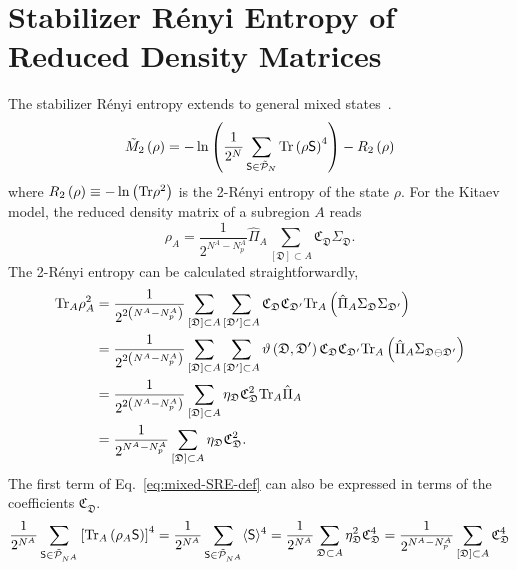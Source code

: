 \section{Stabilizer R\'enyi Entropy of Reduced Density Matrices}
The stabilizer R\'enyi entropy extends to general mixed states~\cite{Leone-Oliviero-Hamma_2022}.
\begin{equation}\label{eq:mixed-SRE-def}
    \tilde{M}_2\left( \rho \right) = 
    -\ln\left( 
            \frac{1}{2^N}
            \sum_{\mathsf{S}\in\tilde{\mathcal{P}}_N}
            \mathrm{Tr}\left( \rho\mathsf{S} \right)^{4}
         \right)
    - R_2\left( \rho \right)
\end{equation}
where $R_2\left( \rho \right) \equiv -\ln\left( \mathrm{Tr}\rho^2 \right)$ is the 2-R\'enyi entropy of the state $\rho$. For the Kitaev model, the reduced density matrix of a subregion $A$ reads~\cite{wang2026exactorganizationdensitymatrices}
\begin{equation}\label{eq:red-den-mat-sim-con}
    \rho_A = \frac{1}{2^{N^A-N^A_p}} \hat{\Pi}_A\sum_{[\mathfrak{D}]\subset A}\mathfrak{C}_{\mathfrak{D}}\Sigma_{\mathfrak{D}}.
\end{equation}
The 2-R\'enyi entropy can be calculated straightforwardly,
\begin{align*}
    \mathrm{Tr}_A\rho_A^2
    &=
    \frac{1}{2^{2\left( N^A - N^A_p \right)}}
        \sum_{[\mathfrak{D}]\subset A}  \sum_{[\mathfrak{D}']\subset A} \mathfrak{C}_{\mathfrak{D}} \mathfrak{C}_{\mathfrak{D}'} 
        \mathrm{Tr}_A\left( 
            \hat{\Pi}_A 
            \Sigma_{\mathfrak{D}} \Sigma_{\mathfrak{D}'}
         \right) \\
    &= 
    \frac{1}{2^{2\left( N^A - N^A_p \right)}}
        \sum_{[\mathfrak{D}]\subset A}  \sum_{[\mathfrak{D}']\subset A} 
        \vartheta\left( \mathfrak{D},\mathfrak{D}' \right)
        \mathfrak{C}_{\mathfrak{D}} \mathfrak{C}_{\mathfrak{D}'} 
        \mathrm{Tr}_A\left( 
            \hat{\Pi}_A 
            \Sigma_{\mathfrak{D}\ominus\mathfrak{D}'}
         \right) \\
    &=
    \frac{1}{2^{2\left( N^A - N^A_p \right)}}
        \sum_{[\mathfrak{D}]\subset A}  \eta_\mathfrak{D}
        \mathfrak{C}_{\mathfrak{D}}^2 
        \mathrm{Tr}_A  \hat{\Pi}_A  \\
    &= 
    \frac{1}{2^{N^A - N^A_p}}
        \sum_{[\mathfrak{D}]\subset A}
        \eta_\mathfrak{D} \mathfrak{C}_{\mathfrak{D}}^2. 
\end{align*}
The first term of Eq.~\eqref{eq:mixed-SRE-def} can also be expressed in terms of the coefficients $\mathfrak{C}_\mathfrak{D}$.
\[
    \frac{1}{2^{N^A}}
        \sum_{\mathsf{S}\in\tilde{\mathcal{P}}_{N^A}}
        \left[ \mathrm{Tr}_A\left( \rho_A\mathsf{S} \right) \right]^{4}
    =
    \frac{1}{2^{N^A}}
    \sum_{\mathsf{S}\in\tilde{\mathcal{P}}_{N^A}}
        \langle \mathsf{S} \rangle^{4}
    =
    \frac{1}{2^{N^A}}
    \sum_{\mathfrak{D}\subset A}
        \eta_\mathfrak{D}^2\mathfrak{C}_\mathfrak{D}^{4}
    =
    \frac{1}{2^{N^A-N^A_p}}
    \sum_{[\mathfrak{D}]\subset A}  \mathfrak{C}_\mathfrak{D}^{4}
\]
